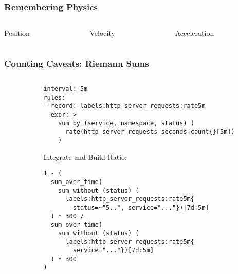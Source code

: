\begin{frame}
    \frametitle{Remembering Physics}
    \begin{columns}
        \begin{column}{0.33\textwidth}
            Position
            \resizebox{\columnwidth}{!}{}
        \end{column}
        \begin{column}{0.33\textwidth}
            Velocity
            \resizebox{\columnwidth}{!}{}
        \end{column}
        \begin{column}{0.33\textwidth}
            Acceleration
            \resizebox{\columnwidth}{!}{}
        \end{column}
    \end{columns}
\end{frame}

\begin{frame}[fragile]
    \frametitle{Counting Caveats: Riemann Sums}
    \begin{columns}
        \begin{column}{0.5\textwidth}
            \resizebox{\columnwidth}{!}{}
        \end{column}
        \begin{column}{0.5\textwidth}
\begin{lstlisting}
interval: 5m
rules:
- record: labels:http_server_requests:rate5m
  expr: >
    sum by (service, namespace, status) (
      rate(http_server_requests_seconds_count{}[5m])
    )
\end{lstlisting}

Integrate and Build Ratio:
            \begin{lstlisting}
1 - (
  sum_over_time(
    sum without (status) (
      labels:http_server_requests:rate5m{
        status=~"5..", service="..."})[7d:5m]
  ) * 300 /
  sum_over_time(
    sum without (status) (
      labels:http_server_requests:rate5m{
        service="..."})[7d:5m]
  ) * 300
)
            \end{lstlisting}
        \end{column}
    \end{columns}
\end{frame}



